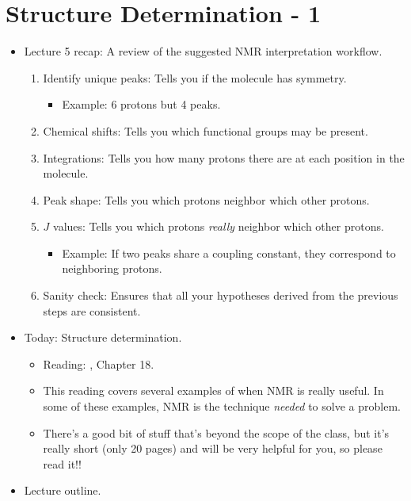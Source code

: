 \documentclass[../notes.tex]{subfiles}
\begin{document}
\section{Structure Determination - 1}
\begin{itemize}
    \item {}Lecture 5 recap: A review of the suggested  NMR interpretation workflow.
    \begin{enumerate}
        \item Identify unique peaks: Tells you if the molecule has symmetry.
        \begin{itemize}
            \item Example: 6 protons but 4 peaks.
        \end{itemize}
        \item Chemical shifts: Tells you which functional groups may be present.
        \item Integrations: Tells you how many protons there are at each position in the molecule.
        \item Peak shape: Tells you which protons neighbor which other protons.
        \item $J$ values: Tells you which protons \emph{really} neighbor which other protons.
        \begin{itemize}
            \item Example: If two peaks share a coupling constant, they correspond to neighboring protons.
        \end{itemize}
        \item Sanity check: Ensures that all your hypotheses derived from the previous steps are consistent.
    \end{enumerate}
    \item Today: Structure determination.
    \begin{itemize}
        \item Reading: \textcite{bib:Clayden}, Chapter 18.
        \item This reading covers several examples of when NMR is really useful. In some of these examples, NMR is the technique \emph{needed} to solve a problem.
        \item There's a good bit of stuff that's beyond the scope of the class, but it's really short (only 20 pages) and will be very helpful for you, so please read it!!
    \end{itemize}
    \item Lecture outline.
    \begin{itemize}

\end{itemize}
\end{itemize}
\end{document}
